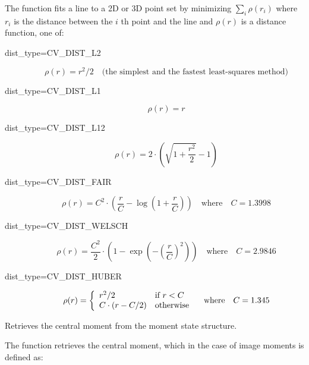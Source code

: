 The function fits a line to a 2D or 3D point set by minimizing $\sum_i \rho(r_i)$ where $r_i$ is the distance between the $i$ th point and the line and $\rho(r)$ is a distance function, one of:

\begin{description}

\item[dist\_type=CV\_DIST\_L2]
\[ \rho(r) = r^2/2 \quad \text{(the simplest and the fastest least-squares method)} \]

\item[dist\_type=CV\_DIST\_L1]
\[ \rho(r) = r \]

\item[dist\_type=CV\_DIST\_L12]
\[ \rho(r) = 2 \cdot (\sqrt{1 + \frac{r^2}{2}} - 1) \]

\item[dist\_type=CV\_DIST\_FAIR]
\[ \rho\left(r\right) = C^2 \cdot \left( \frac{r}{C} - \log{\left(1 + \frac{r}{C}\right)}\right) \quad \text{where} \quad C=1.3998 \]

\item[dist\_type=CV\_DIST\_WELSCH]
\[ \rho\left(r\right) = \frac{C^2}{2} \cdot \left( 1 - \exp{\left(-\left(\frac{r}{C}\right)^2\right)}\right) \quad \text{where} \quad C=2.9846 \]

\item[dist\_type=CV\_DIST\_HUBER]
\[ \rho(r) = \left\{ \begin{array}{l l} r^2/2 & \mbox{if $r < C$}\\ C \cdot (r-C/2) & \mbox{otherwise}\\ \end{array} \right.  \quad \text{where} \quad C=1.345
\]
\end{description}

Retrieves the central moment from the moment state structure.


\begin{description}
\end{description}

The function retrieves the central moment, which in the case of image moments is defined as:

